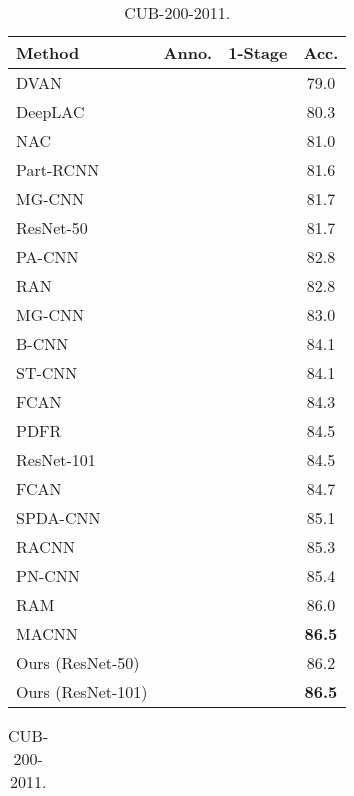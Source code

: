 \documentclass[runningheads]{llncs}
\begin{document}
\begin{table}[p]
\begin{minipage}[p]{0.48\linewidth}
    \centering
    \begin{subtable}[t]{\textwidth}
    \begin{tabular}[t]{lccc}
      \toprule
      Method & Anno. & 1-Stage & Acc.\\
      \midrule
	DVAN \cite{zhao2016diversified} &  &  & 79.0\\
	DeepLAC \cite{lin2015deep} & \checkmark & \checkmark & 80.3\\
	NAC \cite{simon2015neural} &  & \checkmark & 81.0\\
	Part-RCNN \cite{zhang2014part} & \checkmark &  & 81.6\\
	MG-CNN \cite{wang2015multiple} &  &  & 81.7\\
	ResNet-50 \cite{he2016deep} &  & \checkmark & 81.7\\
	PA-CNN \cite{krause2015fine} & \checkmark & \checkmark & 82.8\\
	RAN \cite{wang2017residual} &  &  & 82.8\\
	MG-CNN \cite{wang2015multiple} & \checkmark &  & 83.0\\
	B-CNN \cite{lin2015bilinear} &  &  & 84.1\\
	ST-CNN \cite{jaderberg2015spatial} &  &  & 84.1\\
	FCAN \cite{liu2016fully} &  & \checkmark & 84.3\\
	PDFR \cite{zhang2016picking} &  &  & 84.5\\
	ResNet-101 \cite{he2016deep} &  & \checkmark & 84.5\\
	FCAN \cite{liu2016fully} & \checkmark & \checkmark & 84.7\\
	SPDA-CNN \cite{zhang2016spda} & \checkmark & \checkmark & 85.1\\
	RACNN \cite{fu2017look} &  &  & 85.3\\
	PN-CNN \cite{branson2014bird} & \checkmark &  & 85.4\\
	RAM \cite{li2017dynamic} &  &  & 86.0\\
	MACNN \cite{zheng2017learning} &  & \checkmark & \bf86.5\\
	\midrule
        	Ours (ResNet-50) &  & \checkmark & 86.2\\
	Ours (ResNet-101) &  & \checkmark & \bf86.5\\
        \bottomrule
      \end{tabular}
      \caption{CUB-200-2011.} \label{table:results_cub}
    \end{subtable}
      \begin{subtable}[t]{\textwidth}
  	\begin{tabular}{lccc}

\end{tabular}
\end{subtable}
\end{minipage}
\end{table}
\end{document}
